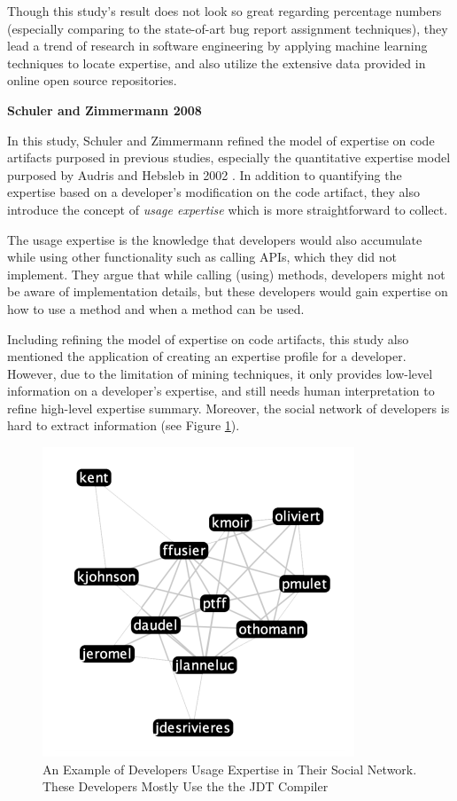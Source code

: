 Though this study's result does not look so great regarding percentage numbers (especially comparing to the state-of-art bug report assignment techniques), they lead a trend of research in software engineering by applying machine learning techniques to locate expertise, and also utilize the extensive data provided in online open source repositories.

\textbf{Schuler and Zimmermann 2008}

In this study, Schuler and Zimmermann refined the model of expertise on code artifacts purposed in previous studies, especially the quantitative expertise model purposed by Audris and Hebsleb in 2002 \cite{mockus2002expertise}. In addition to quantifying the expertise based on a developer's modification on the code artifact, they also introduce the concept of \textit{usage expertise} which is more straightforward to collect.

The usage expertise is the knowledge that developers would also accumulate while using other functionality such as calling APIs, which they did not implement. They argue that while calling (using) methods, developers might not be aware of implementation details, but these developers would gain expertise on how to use a method and when a method can be used.

Including refining the model of expertise on code artifacts, this study also mentioned the application of creating an expertise profile for a developer. However, due to the limitation of mining techniques, it only provides low-level information on a developer's expertise, and still needs human interpretation to refine high-level expertise summary. Moreover, the social network of developers is hard to extract information (see Figure \ref{usage}).

\begin{figure}
\includegraphics[width = 0.4\columnwidth]{usageExpertise.png}
\centering
\caption{An Example of Developers Usage Expertise in Their Social Network. These Developers Mostly Use the the JDT Compiler \cite{schuler2008mining}}
\label{usage}
\end{figure}

